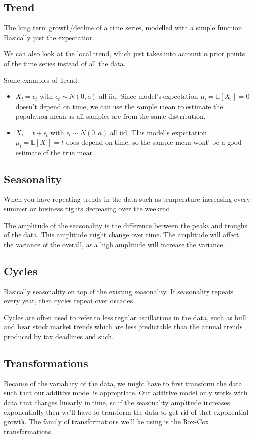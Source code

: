 \documentclass[12pt]{article}
\begin{document}
\subsection{Trend}
The long term growth/decline of a time series, modelled with a simple function. Basically just the expectation.

We can also look at the local trend, which just takes into account \(n\) prior points of the time series instead of all the data.

Some examples of Trend:
\begin{itemize}
    \item \(X_t = \epsilon_t\) with \(\epsilon_t \sim N(0, a)\) all iid.
        Since model's expectation \(\mu_t = \mathbb{E}[X_t] = 0\) doesn't depend on time, 
        we can use the sample mean to estimate the population mean as all samples are from the same distribution.
    \item \(X_t = t + \epsilon_t \) with \(\epsilon_t \sim N(0, a)\) all iid.
        This model's expectation \(\mu_t = \mathbb{E}[X_t] = t\) does depend on time, so the sample mean wont' be a good estimate of the true mean.
\end{itemize}

\subsection{Seasonality}
When you have repeating trends in the data such as temperature increasing every summer or business flights decreasing over the weekend.

The amplitude of the seasonality is the difference between the peaks and troughs of the data.
This amplitude might change over time. The amplitude will affect the variance of the overall, as a high amplitude will increase the variance.


\subsection{Cycles}
Basically seasonality on top of the existing seasonality. If seasonality repeats every year, then cycles repeat over decades. 

Cycles are often used to refer to less regular oscillations in the data, such as bull and bear stock market trends which are less predictable than the annual trends produced by tax deadlines and such.

\subsection{Transformations}
Because of the variablity of the data, we might have to first transform the data such that our additive model is appropriate.
Our additive model only works with data that changes linearly in time, so if the seasonality amplitude increases exponentially then we'll have to transform the data to get rid of that exponential growth.
The family of transformations we'll be using is the Box-Cox transformations.
\end{document}
